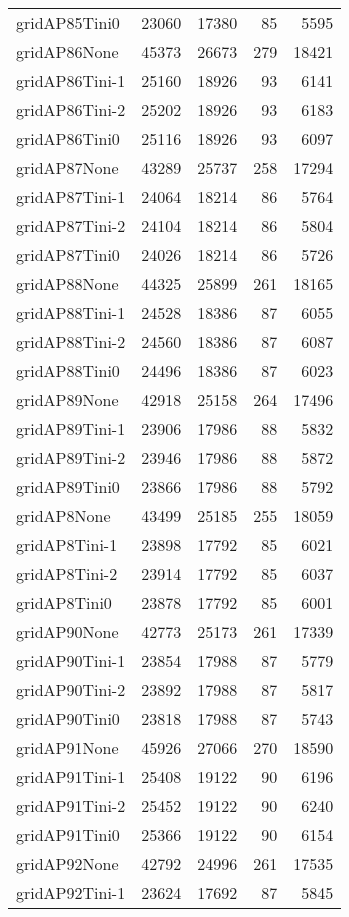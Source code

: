 \begin{longtable}{lrrrr}
gridAP85Tini0 & 23060 & 17380 & 85 & 5595 \\
gridAP86None & 45373 & 26673 & 279 & 18421 \\
gridAP86Tini-1 & 25160 & 18926 & 93 & 6141 \\
gridAP86Tini-2 & 25202 & 18926 & 93 & 6183 \\
gridAP86Tini0 & 25116 & 18926 & 93 & 6097 \\
gridAP87None & 43289 & 25737 & 258 & 17294 \\
gridAP87Tini-1 & 24064 & 18214 & 86 & 5764 \\
gridAP87Tini-2 & 24104 & 18214 & 86 & 5804 \\
gridAP87Tini0 & 24026 & 18214 & 86 & 5726 \\
gridAP88None & 44325 & 25899 & 261 & 18165 \\
gridAP88Tini-1 & 24528 & 18386 & 87 & 6055 \\
gridAP88Tini-2 & 24560 & 18386 & 87 & 6087 \\
gridAP88Tini0 & 24496 & 18386 & 87 & 6023 \\
gridAP89None & 42918 & 25158 & 264 & 17496 \\
gridAP89Tini-1 & 23906 & 17986 & 88 & 5832 \\
gridAP89Tini-2 & 23946 & 17986 & 88 & 5872 \\
gridAP89Tini0 & 23866 & 17986 & 88 & 5792 \\
gridAP8None & 43499 & 25185 & 255 & 18059 \\
gridAP8Tini-1 & 23898 & 17792 & 85 & 6021 \\
gridAP8Tini-2 & 23914 & 17792 & 85 & 6037 \\
gridAP8Tini0 & 23878 & 17792 & 85 & 6001 \\
gridAP90None & 42773 & 25173 & 261 & 17339 \\
gridAP90Tini-1 & 23854 & 17988 & 87 & 5779 \\
gridAP90Tini-2 & 23892 & 17988 & 87 & 5817 \\
gridAP90Tini0 & 23818 & 17988 & 87 & 5743 \\
gridAP91None & 45926 & 27066 & 270 & 18590 \\
gridAP91Tini-1 & 25408 & 19122 & 90 & 6196 \\
gridAP91Tini-2 & 25452 & 19122 & 90 & 6240 \\
gridAP91Tini0 & 25366 & 19122 & 90 & 6154 \\
gridAP92None & 42792 & 24996 & 261 & 17535 \\
gridAP92Tini-1 & 23624 & 17692 & 87 & 5845 \\

\end{longtable}
